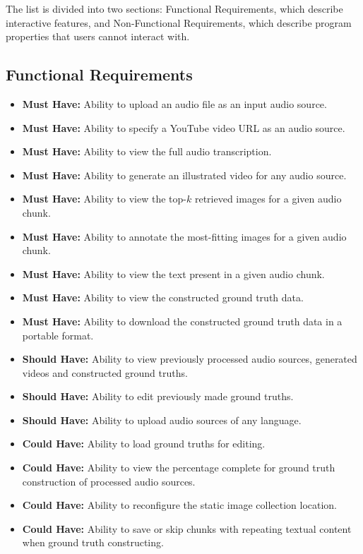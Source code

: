 \documentclass{l4proj}
\begin{document}
The list is divided into two sections: Functional Requirements, which describe interactive features, and Non-Functional Requirements, which describe program properties that users cannot interact with.

\subsection{Functional Requirements}
\begin{itemize}
    \item \textbf{Must Have:} Ability to upload an audio file as an input audio source.
    \item \textbf{Must Have:} Ability to specify a YouTube video URL as an audio source.
    \item \textbf{Must Have:} Ability to view the full audio transcription.
    \item \textbf{Must Have:} Ability to generate an illustrated video for any audio source.
    \item \textbf{Must Have:} Ability to view the top-$k$ retrieved images for a given audio chunk.
    \item \textbf{Must Have:} Ability to annotate the most-fitting images for a given audio chunk.
    \item \textbf{Must Have:} Ability to view the text present in a given audio chunk.
    \item \textbf{Must Have:} Ability to view the constructed ground truth data.
    \item \textbf{Must Have:} Ability to download the constructed ground truth data in a portable format.
    \item \textbf{Should Have:} Ability to view previously processed audio sources, generated videos and constructed ground truths.
    \item \textbf{Should Have:} Ability to edit previously made ground truths.
    \item \textbf{Should Have:} Ability to upload audio sources of any language.
    \item \textbf{Could Have:} Ability to load ground truths for editing.
    \item \textbf{Could Have:} Ability to view the percentage complete for ground truth construction of processed audio sources.
    \item \textbf{Could Have:} Ability to reconfigure the static image collection location.
    \item \textbf{Could Have:} Ability to save or skip chunks with repeating textual content when ground truth constructing.
\end{itemize}
\end{document}
